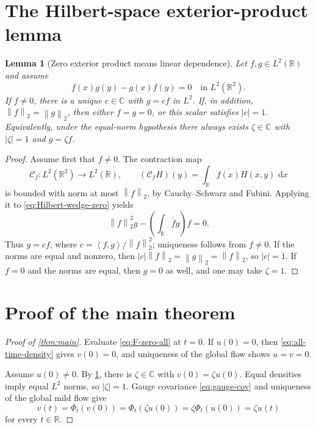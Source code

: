 \documentclass[11pt,oneside]{book}
\newtheorem{lemma}[theorem]{Lemma}
\theoremstyle{definition}
\theoremstyle{remark}
\newcommand{\R}{\mathbb R}
\newcommand{\C}{\mathbb C}
\newcommand{\1}{\mathbf 1}
\newcommand{\dd}{\,\mathrm d}
\newcommand{\norm}[1]{\left\lVert #1\right\rVert}
\newcommand{\pair}[2]{\left\langle #1,#2\right\rangle}
\begin{document}
\section{The Hilbert-space exterior-product lemma}

\begin{lemma}[Zero exterior product means linear dependence]
\label{lem:Hilbert-wedge}
Let $f,g\in L^2(\R)$ and assume
\begin{equation}
 f(x)g(y)-g(x)f(y)=0
 \quad\text{in }L^2(\R^2).                         \label{eq:Hilbert-wedge-zero}
\end{equation}
If $f\ne0$, there is a unique $c\in\C$ with $g=cf$ in $L^2$.  If, in
addition, $\norm f_2=\norm g_2$, then either $f=g=0$, or this scalar satisfies
$|c|=1$.  Equivalently, under the equal-norm hypothesis there always exists
$\zeta\in\C$ with $|\zeta|=1$ and $g=\zeta f$.
\end{lemma}

\begin{proof}
Assume first that $f\ne0$.  The contraction map
\[
 \mathcal C_f:L^2(\R^2)\to L^2(\R),
 \qquad
 (\mathcal C_fH)(y)=\int_\R\overline{f(x)}H(x,y)\,\dd x
\]
is bounded with norm at most $\norm f_2$, by Cauchy--Schwarz and Fubini.
Applying it to \eqref{eq:Hilbert-wedge-zero} yields
\[
 \norm f_2^2g-\left(\int_\R\overline f g\right)f=0.
\]
Thus $g=cf$, where
$c=\pair f g/\norm f_2^2$; uniqueness follows from $f\ne0$.  If the norms are
equal and nonzero, then
$|c|\norm f_2=\norm g_2=\norm f_2$, so $|c|=1$.
If $f=0$ and the norms are equal, then $g=0$ as well, and one may take
$\zeta=1$.
\end{proof}

\section{Proof of the main theorem}

\begin{proof}[Proof of \cref{thm:main}]
Evaluate \eqref{eq:F-zero-all} at $t=0$.  If $u(0)=0$, then
\eqref{eq:all-time-density} gives $v(0)=0$, and uniqueness of the global flow
shows $u=v=0$.

Assume $u(0)\ne0$.  By \cref{lem:Hilbert-wedge}, there is $\zeta\in\C$ with
$v(0)=\zeta u(0)$.  Equal densities imply equal $L^2$ norms, so
$|\zeta|=1$.  Gauge covariance \eqref{eq:gauge-cov} and uniqueness of the
global mild flow give
\[
 v(t)=\Phi_t(v(0))
     =\Phi_t(\zeta u(0))
     =\zeta\Phi_t(u(0))
     =\zeta u(t)
\]
for every $t\in\R$.
\end{proof}
\end{document}
